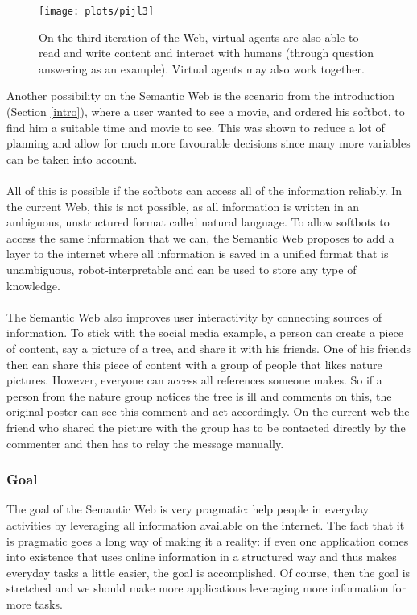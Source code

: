 \documentclass{article}
\begin{document}
 \begin{figure}[H]
 \centering
 \texttt{[image: plots/pijl3]}
 \caption[Web 3.0]{On the third iteration of the Web, virtual agents are also able to read and write content and interact with humans (through question answering as an example). Virtual agents may also work together.}
 \label{web3}
 \end{figure}
 
 Another possibility on the Semantic Web is the scenario from the introduction (Section \ref{intro}), where a user wanted to see a movie, and ordered his softbot, to find him a suitable time and movie to see. This was shown to reduce a lot of planning and allow for much more favourable decisions since many more variables can be taken into account.
 \paragraph{}
 All of this is possible if the softbots can access all of the information reliably. In the current Web, this is not possible, as all information is written in an ambiguous, unstructured format called natural language. To allow softbots to access the same information that we can, the Semantic Web proposes to add a layer to the internet where all information is saved in a unified format that is unambiguous, robot-interpretable and can be used to store any type of knowledge.
 \paragraph{}
  The Semantic Web also improves user interactivity by connecting sources of information. To stick with the social media example, a person can create a piece of content, say a picture of a tree, and share it with his friends. One of his friends then can share this piece of content with a group of people that likes nature pictures. However, everyone can access all references someone makes. So if a person from the nature group notices the tree is ill and comments on this, the original poster can see this comment and act accordingly. On the current web the friend who shared the picture with the group has to be contacted directly by the commenter and then has to relay the message manually.
 
 \subsubsection{Goal}
 The goal of the Semantic Web is very pragmatic: help people in everyday activities by leveraging all information available on the internet. The fact that it is pragmatic goes a long way of making it a reality: if even one application comes into existence that uses online information in a structured way and thus makes everyday tasks a little easier, the goal is accomplished. Of course, then the goal is stretched and we should make more applications leveraging more information for more tasks.
\end{document}
